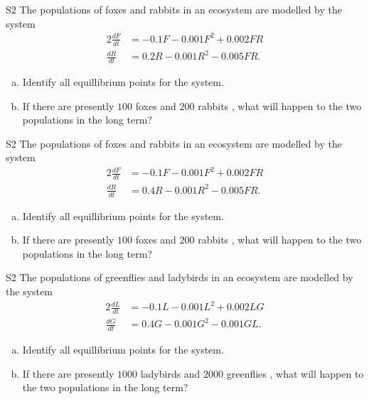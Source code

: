 \begin{problem}{S2}
The populations of foxes and rabbits in an ecosystem are modelled by the system
\begin{alignat*}{2}
\frac{dF}{dt} &= -0.1F - 0.001F^2 + 0.002FR \\
\frac{dR}{dt} & = 0.2R - 0.001R^2 - 0.005FR.
\end{alignat*}
\begin{enumerate}[(a)]
\item Identify all equillibrium points for the system.
\item If there are presently \(100\) foxes and \(200\) rabbits , what will happen to the two populations in the long term?
\end{enumerate}
\end{problem}

\begin{problem}{S2}
The populations of foxes and rabbits in an ecosystem are modelled by the system
\begin{alignat*}{2}
\frac{dF}{dt} &= -0.1F - 0.001F^2 + 0.002FR \\
\frac{dR}{dt} & = 0.4R - 0.001R^2 - 0.005FR.
\end{alignat*}
\begin{enumerate}[(a)]
\item Identify all equillibrium points for the system.
\item If there are presently \(100\) foxes and \(200\) rabbits , what will happen to the two populations in the long term?
\end{enumerate}
\end{problem}

\begin{problem}{S2}
The populations of greenflies and ladybirds in an ecosystem are modelled by the system
\begin{alignat*}{2}
\frac{dL}{dt} &= -0.1L - 0.001L^2 + 0.002LG \\
\frac{dG}{dt} & = 0.4G - 0.001G^2 - 0.001GL.
\end{alignat*}
\begin{enumerate}[(a)]
\item Identify all equillibrium points for the system.
\item If there are presently \(1000\) ladybirds and \(2000\) greenflies , what will happen to the two populations in the long term?
\end{enumerate}
\end{problem}


